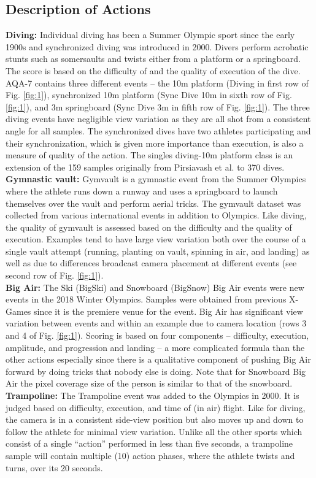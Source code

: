 \documentclass[10pt,twocolumn,letterpaper]{article}
\begin{document}
\subsection{Description of Actions}
\textbf{Diving: }
Individual diving has been a Summer Olympic sport since the early 1900s and synchronized diving was introduced in 2000.  Divers perform acrobatic stunts such as somersaults and twists either from a platform or a springboard.  The score is based on the difficulty of and the quality of execution of the dive.  AQA-7 contains three different events -- the 10m platform (Diving in first row of Fig. \ref{fig:1}), synchronized 10m platform (Sync Dive 10m in sixth row of Fig. \ref{fig:1}), and 3m springboard (Sync Dive 3m in fifth row of Fig. \ref{fig:1}).  The three diving events have negligible view variation as they are all shot from a consistent angle for all samples.  The synchronized dives have two athletes participating and their synchronization, which is given more importance than execution, is also a measure of quality of the action. The singles diving-10m platform class is an extension of the 159 samples originally from Pirsiavash et al. \cite{pirsia} to 370 dives. \\
\textbf{Gymnastic vault: }
Gymvault is a gymnastic event from the Summer Olympics where the athlete runs down a runway and uses a springboard to launch themselves over the vault and perform aerial tricks.  The gymvault dataset was collected from various international events in addition to Olympics.  Like diving, the quality of gymvault is assessed based on the difficulty and the quality of execution.  Examples tend to have large view variation both over the course of a single vault attempt (running, planting on vault, spinning in air, and landing) as well as due to differences broadcast camera placement at different events (see second row of Fig. \ref{fig:1}).  \\
\textbf{Big Air: }
The Ski (BigSki) and Snowboard (BigSnow) Big Air events were new events in the 2018 Winter Olympics.  Samples were obtained from previous X-Games since it is the premiere venue for the event.  Big Air has significant view variation between events and within an example due to camera location (rows 3 and 4 of Fig. \ref{fig:1}).  Scoring is based on four components -- difficulty, execution, amplitude, and progression and landing -- a more complicated formula than the other actions especially since there is a qualitative component of pushing Big Air forward by doing tricks that nobody else is doing.  Note that for Snowboard Big Air the pixel coverage size of the person is similar to that of the snowboard.\\
\textbf{Trampoline: }
The Trampoline event was added to the Olympics in 2000.  It is judged based on difficulty, execution, and time of (in air) flight.  Like for diving, the camera is in a consistent side-view position but also moves up and down to follow the athlete for minimal view variation.  Unlike all the other sports which consist of a single ``action'' performed in less than five seconds, a trampoline sample will contain multiple (10) action phases, where the athlete twists and turns, over its 20 seconds.  
\end{document}
